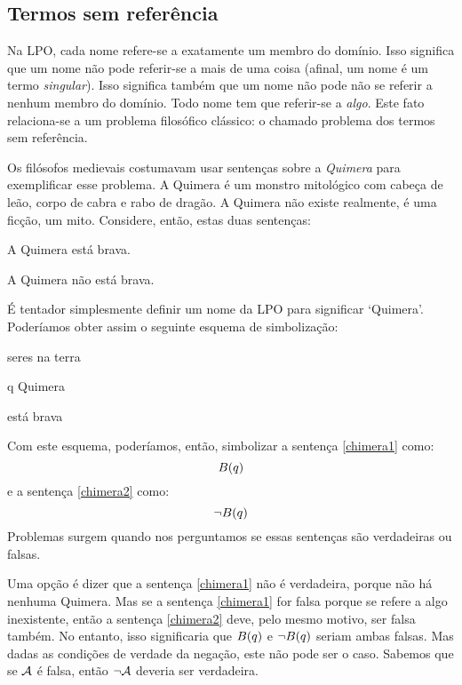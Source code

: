 \subsection{Termos sem referência}

Na LPO, cada nome refere-se a exatamente um membro do domínio.
Isso significa que um nome não pode referir-se a mais de uma coisa (afinal, um nome é um termo \emph{singular}).
Isso significa também que um nome não pode não se referir a nenhum membro do domínio.
Todo nome tem que referir-se a \emph{algo}.
Este fato relaciona-se a um problema filosófico clássico: o chamado problema dos termos sem referência.

Os filósofos medievais costumavam usar sentenças sobre a \emph{Quimera} para exemplificar esse problema.
A Quimera é um monstro mitológico com cabeça de leão, corpo de cabra e rabo de dragão.
A Quimera não existe realmente, é uma ficção, um mito.
Considere, então, estas duas sentenças:
\begin{earg}
\item[\ex{chimera1}] A Quimera está brava.
\item[\ex{chimera2}] A Quimera não está brava.
\end{earg}
É tentador simplesmente definir um nome da LPO para significar `Quimera'.
Poderíamos obter assim o seguinte esquema de simbolização:
\begin{center}
\begin{ekey}
\item[\text{domínio}] seres na terra
\item[q] Quimera
\item[\atom{B}{x}]  está brava
\end{ekey}
\end{center}
Com este esquema, poderíamos, então, simbolizar a sentença \ref{chimera1} como:
$$\mathord{B}(q)$$
e a sentença \ref{chimera2} como:
$$\neg\mathord{B}(q)$$
Problemas surgem quando nos perguntamos se essas sentenças são verdadeiras ou falsas.

Uma opção é dizer que a sentença \ref{chimera1} não é verdadeira, porque não há nenhuma Quimera. 
Mas se a sentença \ref{chimera1} for falsa porque se refere a algo inexistente, então a sentença \ref{chimera2} deve, pelo mesmo motivo, ser falsa também.
No entanto, isso significaria que $\mathord{B}(q)$ e $\neg \mathord{B}(q)$ seriam ambas falsas.
Mas dadas as condições de verdade da negação, este não pode ser o caso.
Sabemos que se $\mathcal{A}$ é falsa, então $\neg\mathcal{A}$ deveria ser verdadeira.

